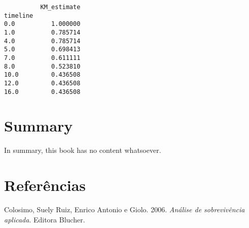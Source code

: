 \documentclass[
  letterpaper,
  DIV=11,
  numbers=noendperiod]{scrreprt}
\newlength{\cslhangindent}
\newlength{\cslentryspacingunit} %
\newenvironment{CSLReferences}[2] %
 {%
  \setlength{\parindent}{0pt}
  \ifodd #1
  \let\oldpar\par
  \def\par{\hangindent=\cslhangindent\oldpar}
  \fi
  \setlength{\parskip}{#2\cslentryspacingunit}
 }%
 {}
\begin{document}
\begin{verbatim}
          KM_estimate
timeline             
0.0          1.000000
1.0          0.785714
4.0          0.785714
5.0          0.698413
7.0          0.611111
8.0          0.523810
10.0         0.436508
12.0         0.436508
16.0         0.436508
\end{verbatim}

\hypertarget{summary}{%
\chapter{Summary}\label{summary}}

In summary, this book has no content whatsoever.

\hypertarget{referuxeancias}{%
\chapter*{Referências}\label{referuxeancias}}

\hypertarget{refs}{}
\begin{CSLReferences}{1}{0}
\leavevmode{}%
Colosimo, Suely Ruiz, Enrico Antonio e Giolo. 2006. \emph{An{á}lise de
sobreviv{ê}ncia aplicada}. Editora Blucher.

\end{CSLReferences}
\end{document}
